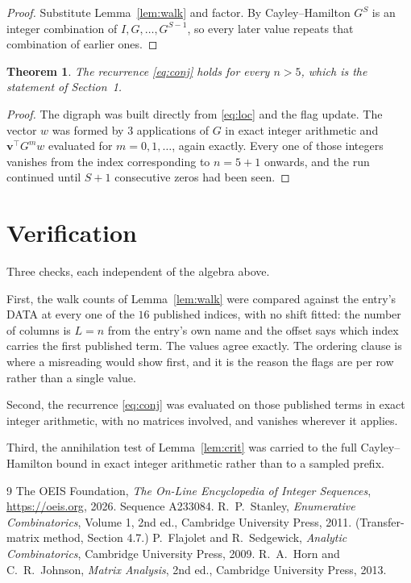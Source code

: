 \documentclass[11pt,a4paper]{article}
\theoremstyle{plain}
\newtheorem{theorem}{Theorem}
\theoremstyle{definition}
\begin{document}
\begin{proof}
Substitute Lemma~\ref{lem:walk} and factor. By Cayley--Hamilton $G^{S}$ is an integer
combination of $I,G,\dots,G^{S-1}$, so every later value repeats that combination of earlier
ones.
\end{proof}

\begin{theorem}
The recurrence \eqref{eq:conj} holds for every $n>5$, which is the statement of
Section~1.
\end{theorem}

\begin{proof}
The digraph was built directly from \eqref{eq:loc} and the flag update. The vector $w$ was
formed by $3$ applications of $G$ in exact integer arithmetic and
$\mathbf{v}^{\!\top}G^{m}w$ evaluated for $m=0,1,\dots$, again exactly. Every one of
those integers vanishes from the index corresponding to $n=5+1$ onwards, and the run
continued until $S+1$ consecutive zeros had been seen.
\end{proof}

\section{Verification}

Three checks, each independent of the algebra above.

First, the walk counts of Lemma~\ref{lem:walk} were compared against the entry's DATA at
every one of the $16$ published indices, with no shift fitted: the number of columns is
$L=n$ from the entry's own name and the offset says which index carries the first
published term. The values agree exactly. The ordering clause is where a misreading would
show first, and it is the reason the flags are per row rather than a single value.

Second, the recurrence \eqref{eq:conj} was evaluated on those published terms in exact
integer arithmetic, with no matrices involved, and vanishes wherever it applies.

Third, the annihilation test of Lemma~\ref{lem:crit} was carried to the full
Cayley--Hamilton bound in exact integer arithmetic rather than to a sampled prefix.

\begin{thebibliography}{9}
 The OEIS Foundation, \emph{The On-Line Encyclopedia of Integer
Sequences}, \url{https://oeis.org}, 2026. Sequence A233084.
 R.~P.~Stanley, \emph{Enumerative Combinatorics}, Volume 1, 2nd ed.,
Cambridge University Press, 2011. (Transfer-matrix method, Section 4.7.)
 P.~Flajolet and R.~Sedgewick, \emph{Analytic Combinatorics}, Cambridge
University Press, 2009.
 R.~A.~Horn and C.~R.~Johnson, \emph{Matrix Analysis}, 2nd ed., Cambridge
University Press, 2013.
\end{thebibliography}
\end{document}
